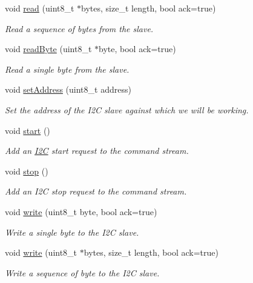 \begin{DoxyCompactItemize}
\item 
void \hyperlink{class_i2_c_ac81d33d8192945eb2caa210ae5055851}{read} (uint8\+\_\+t $\ast$bytes, size\+\_\+t length, bool ack=true)
\begin{DoxyCompactList}\small\item\em Read a sequence of bytes from the slave. \end{DoxyCompactList}\item 
void \hyperlink{class_i2_c_a0f0864bb484bbfebe64e520ee189ca41}{read\+Byte} (uint8\+\_\+t $\ast$byte, bool ack=true)
\begin{DoxyCompactList}\small\item\em Read a single byte from the slave. \end{DoxyCompactList}\item 
void \hyperlink{class_i2_c_ab6ea7b33432cfea858484411741b3bca}{set\+Address} (uint8\+\_\+t address)
\begin{DoxyCompactList}\small\item\em Set the address of the I2C slave against which we will be working. \end{DoxyCompactList}\item 
void \hyperlink{class_i2_c_a07463a2babdabbd675a2745fb53650ca}{start} ()\hypertarget{class_i2_c_a07463a2babdabbd675a2745fb53650ca}{}\label{class_i2_c_a07463a2babdabbd675a2745fb53650ca}

\begin{DoxyCompactList}\small\item\em Add an \hyperlink{class_i2_c}{I2C} start request to the command stream. \end{DoxyCompactList}\item 
void \hyperlink{class_i2_c_ac9a9e5ea511ff86f474866052a7fabf1}{stop} ()\hypertarget{class_i2_c_ac9a9e5ea511ff86f474866052a7fabf1}{}\label{class_i2_c_ac9a9e5ea511ff86f474866052a7fabf1}

\begin{DoxyCompactList}\small\item\em Add an I2C stop request to the command stream. \end{DoxyCompactList}\item 
void \hyperlink{class_i2_c_a4a8d11dbd76409914f1e6404dacb2073}{write} (uint8\+\_\+t byte, bool ack=true)
\begin{DoxyCompactList}\small\item\em Write a single byte to the I2C slave. \end{DoxyCompactList}\item 
void \hyperlink{class_i2_c_a870ba63321e9a51f4b7475e85ae112ce}{write} (uint8\+\_\+t $\ast$bytes, size\+\_\+t length, bool ack=true)
\begin{DoxyCompactList}\small\item\em Write a sequence of byte to the I2C slave. \end{DoxyCompactList}\end{DoxyCompactItemize}
